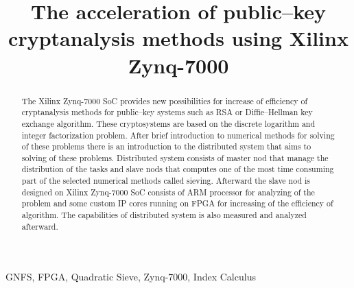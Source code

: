 \documentclass[conference]{IEEEtran}
\begin{document}
\title{The acceleration of public--key cryptanalysis methods using Xilinx Zynq-7000
}

\author{
\and
{}
}

\maketitle

\begin{abstract}
The Xilinx Zynq-7000 SoC provides new possibilities for increase of efficiency of cryptanalysis methods  for public--key systems such as RSA or Diffie--Hellman key exchange algorithm. These cryptosystems are based on the discrete logarithm and integer factorization problem. After brief introduction to numerical methods for solving of these problems there is an introduction to the distributed system that aims to solving of these problems. Distributed system consists of master nod that manage the distribution of the tasks and slave nods that computes one of the most time consuming part of the selected numerical methods called sieving. Afterward the slave nod is designed on Xilinx Zynq-7000 SoC consists of ARM processor for analyzing of the problem and some custom IP cores running on FPGA for increasing of the efficiency of algorithm. The capabilities of distributed system is also measured and analyzed afterward.
\end{abstract}

\begin{IEEEkeywords}
GNFS, FPGA, Quadratic Sieve, Zynq-7000, Index Calculus
\end{IEEEkeywords}
\end{document}

